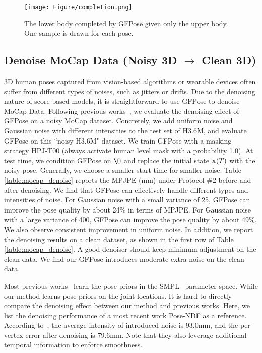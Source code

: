 \documentclass[10pt,twocolumn,letterpaper]{article}
\begin{document}
\begin{figure}[!t]
    \centering
\texttt{[image: Figure/completion.png]}
    \vspace{-0.6em}
    \caption{The \textcolor[RGB]{255,143,163}{lower body} completed by GFPose given only the \textcolor[RGB]{97,165,194}{upper body}. One sample is drawn for each pose.}
    \vspace{-1.5em}
    \label{fig:viz_complete}
\end{figure}


\vspace{-0.1em}
\subsection{Denoise MoCap Data (Noisy 3D $\rightarrow$ Clean 3D)}
\vspace{-0.2em}
3D human poses captured from vision-based algorithms or wearable devices often suffer from different types of noises, such as jitters or drifts. Due to the denoising nature of score-based models, it is straightforward to use GFPose to denoise MoCap Data. Following previous works~\cite{tiwari2022pose}, we evaluate the denoising effect of GFPose on a noisy MoCap dataset. Concretely, we add uniform noise and Gaussian noise with different intensities to the test set of H3.6M, and evaluate GFPose on this ``noisy H3.6M" dataset. 
We train GFPose with a masking strategy HPJ-T00 (always activate human level mask with a probability 1.0). At test time, we condition GFPose on $\O$ and replace the initial state $\mathbf{x}(T)$ with the noisy pose. Generally, we choose a smaller start time for smaller noise.
Table \ref{table:mocap_denoise} reports the MPJPE (mm) under Protocol \#2 before and after denoising. We find that GFPose can effectively handle different types and intensities of noise. For Gaussian noise with a small variance of 25, GFPose can improve the pose quality by about 24\% in terms of MPJPE. For Gaussian noise with a large variance of 400, GFPose can improve the pose quality by about 49\%. We also observe consistent improvement in uniform noise. In addition, we report the denoising results on a clean dataset, as shown in the first row of Table \ref{table:mocap_denoise}. A good denoiser should keep minimum adjustment on the clean data. We find our GFPose introduces moderate extra noise on the clean data.

Most previous works~\cite{tiwari2022pose, rempe2021humor, pavlakos2019expressive, davydov2022adversarial} learn the pose priors in the SMPL~\cite{loper2015smpl} parameter space. While our method learns pose priors on the joint locations. It is hard to directly compare the denoising effect between our method and previous works. Here, we list the denoising performance of a most recent work Pose-NDF\cite{tiwari2022pose} as a reference. According to~\cite{tiwari2022pose}, the average intensity of introduced noise is 93.0mm, and the per-vertex error after denoising is 79.6mm. Note that they also leverage additional temporal information to enforce smoothness.
\end{document}
